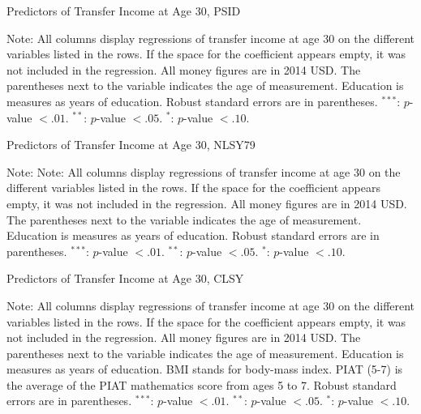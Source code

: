 \begin{table}[H] 
\begin{threeparttable}
\caption{Predictors of Transfer Income at Age 30, PSID}
\label{table:predpsid}
\centering 

\begin{tablenotes}
\footnotesize
\item Note: All columns display regressions of transfer income at age 30 on the different variables listed in the rows. If the space for the coefficient appears empty, it was not included in the regression. All money figures are in 2014 USD. The parentheses next to the variable indicates the age of measurement. Education is measures as years of education. Robust standard errors are in parentheses. $^{***}$: $p$-value $< .01$. $^{**}$: $p$-value $< .05$. $^{*}$: $p$-value $< .10$.
\end{tablenotes}
\end{threeparttable}
\end{table}

\begin{table}[H] 
\begin{threeparttable}
\caption{Predictors of Transfer Income at Age 30, NLSY79}
\label{table:prednlsy}
\centering 

\begin{tablenotes}
\footnotesize
\item Note: Note: All columns display regressions of transfer income at age 30 on the different variables listed in the rows. If the space for the coefficient appears empty, it was not included in the regression. All money figures are in 2014 USD. The parentheses next to the variable indicates the age of measurement. Education is measures as years of education. Robust standard errors are in parentheses. $^{***}$: $p$-value $< .01$. $^{**}$: $p$-value $< .05$. $^{*}$: $p$-value $< .10$.
\end{tablenotes}
\end{threeparttable}
\end{table}

\begin{table}[H] 
\begin{threeparttable}
\caption{Predictors of Transfer Income at Age 30, CLSY}
\label{table:predcnlsy}
\centering 

\begin{tablenotes}
\footnotesize
\item Note: All columns display regressions of transfer income at age 30 on the different variables listed in the rows. If the space for the coefficient appears empty, it was not included in the regression. All money figures are in 2014 USD. The parentheses next to the variable indicates the age of measurement. Education is measures as years of education. BMI stands for body-mass index. PIAT (5-7) is the average of the PIAT mathematics score from ages 5 to 7. Robust standard errors are in parentheses. $^{***}$: $p$-value $< .01$. $^{**}$: $p$-value $< .05$. $^{*}$: $p$-value $< .10$.
\end{tablenotes}
\end{threeparttable}
\end{table}

